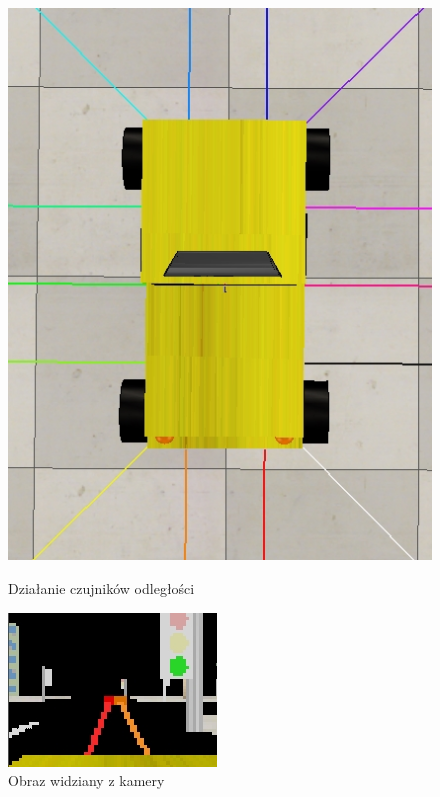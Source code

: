 \begin{figure}
	\centering
	\parbox{.33\linewidth}{
		\includegraphics[width=\linewidth]{car_sensors.jpg}
		\caption{Działanie czujników odległości}
		\label{fig:model_odl}
	}
	\parbox{.58\linewidth}{
		\includegraphics[width=\linewidth]{car_kinect.jpg}
		\caption{Obraz widziany z kamery}
		\label{fig:model_kinect}
	}
\end{figure}
